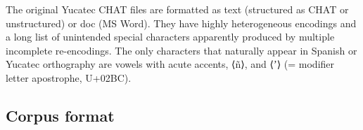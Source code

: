 \documentclass[a4paper, 11pt]{book}
\begin{document}
The original Yucatec CHAT files are formatted as text (structured as CHAT or unstructured) or doc (MS Word). They have highly heterogeneous encodings and a long list of unintended special characters apparently produced by multiple incomplete re-encodings. The only characters that naturally appear in Spanish or Yucatec orthography are vowels with acute accents, ⟨ñ⟩, and ⟨ʼ⟩ (= modifier letter apostrophe, U+02BC).

\subsection{Corpus format}

\end{document}
